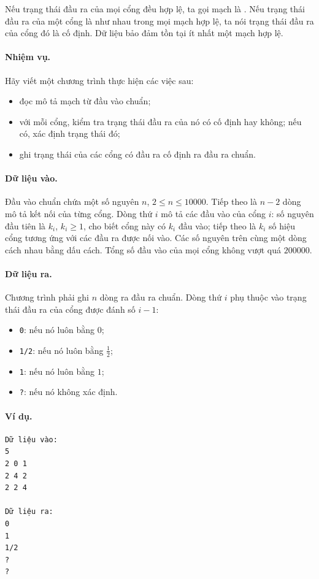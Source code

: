 \documentclass[11pt]{article}
\begin{document}
Nếu trạng thái đầu ra của mọi cổng đều hợp lệ, ta gọi mạch là .
Nếu trạng thái đầu ra của một cổng là như nhau trong mọi mạch hợp lệ, ta nói
trạng thái đầu ra của cổng đó là cố định. Dữ liệu bảo đảm tồn tại ít nhất một
mạch hợp lệ.

\paragraph{Nhiệm vụ.}
Hãy viết một chương trình thực hiện các việc sau:
\begin{itemize}
  \item đọc mô tả mạch từ đầu vào chuẩn;
  \item với mỗi cổng, kiểm tra trạng thái đầu ra của nó có cố định hay không;
  nếu có, xác định trạng thái đó;
  \item ghi trạng thái của các cổng có đầu ra cố định ra đầu ra chuẩn.
\end{itemize}

\paragraph{Dữ liệu vào.}
Đầu vào chuẩn chứa một số nguyên \(n\), \(2\le n\le 10000\). Tiếp theo là
\(n-2\) dòng mô tả kết nối của từng cổng. Dòng thứ \(i\) mô tả các đầu vào của
cổng \(i\): số nguyên đầu tiên là \(k_i\), \(k_i\ge 1\), cho biết cổng này có
\(k_i\) đầu vào; tiếp theo là \(k_i\) số hiệu cổng tương ứng với các đầu ra
được nối vào. Các số nguyên trên cùng một dòng cách nhau bằng dấu cách. Tổng số
đầu vào của mọi cổng không vượt quá \(200000\).

\paragraph{Dữ liệu ra.}
Chương trình phải ghi \(n\) dòng ra đầu ra chuẩn. Dòng thứ \(i\) phụ thuộc vào
trạng thái đầu ra của cổng được đánh số \(i-1\):
\begin{itemize}
  \item \texttt{0}: nếu nó luôn bằng \(0\);
  \item \texttt{1/2}: nếu nó luôn bằng \(\frac12\);
  \item \texttt{1}: nếu nó luôn bằng \(1\);
  \item \texttt{?}: nếu nó không xác định.
\end{itemize}

\paragraph{Ví dụ.}
\begin{verbatim}
Dữ liệu vào:
5
2 0 1
2 4 2
2 2 4

Dữ liệu ra:
0
1
1/2
?
?
\end{verbatim}
\end{document}
